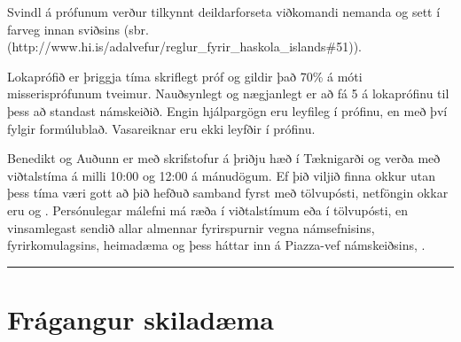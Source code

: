 \documentclass[b5paper,10pt,icelandic]{sphinxmanual}
\begin{document}
Svindl á prófunum verður
tilkynnt deildarforseta viðkomandi nemanda og sett í
farveg innan sviðsins (sbr.
 (http://www.hi.is/adalvefur/reglur\_fyrir\_haskola\_islands\#51)).

Lokaprófið er þriggja tíma skriflegt próf og gildir það 70\% á móti
misserisprófunum tveimur. Nauðsynlegt og nægjanlegt er að fá 5 á
lokaprófinu til þess að standast námskeiðið. Engin hjálpargögn eru
leyfileg í prófinu, en með því fylgir formúlublað.
Vasareiknar eru ekki leyfðir í prófinu.

 Benedikt og Auðunn er með skrifstofur á þriðju hæð í Tæknigarði
og verða með viðtalstíma á milli 10:00 og 12:00 á
mánudögum. Ef þið viljið finna okkur utan þess tíma væri gott að þið
hefðuð samband fyrst með tölvupósti, netföngin okkar eru 
og . Persónulegar málefni má ræða í viðtalstímum eða í
tölvupósti, en vinsamlegast sendið allar almennar fyrirspurnir vegna
námsefnisins, fyrirkomulagsins, heimadæma og þess háttar inn á Piazza-vef
námskeiðsins, .


\bigskip\hrule\bigskip


\newpage


\section{Frágangur skiladæma}
\label{\detokenize{vidauki:fragangur-skiladaema}}\label{\detokenize{vidauki:fragangurskiladaema}}
\end{document}
